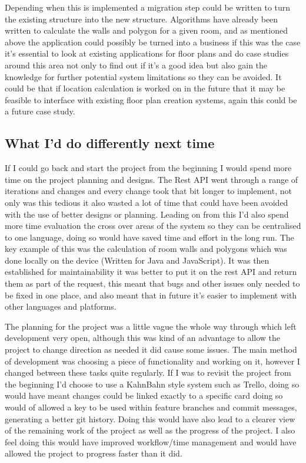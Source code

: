 Depending when this is implemented a migration step could be written to turn the existing structure into the new structure. Algorithms have already been written to calculate the walls and polygon for a given room, and as mentioned above the application could possibly be turned into a business if this was the case it's essential to look at existing applications for floor plans and do case studies around this area not only to find out if it's a good idea but also gain the knowledge for further potential system limitations so they can be avoided. It could be that if location calculation is worked on in the future that it may be feasible to interface with existing floor plan creation systems, again this could be a future case study.

\subsection{What I'd do differently next time}
If I could go back and start the project from the beginning I would spend more time on the project planning and designs. The Rest API went through a range of iterations and changes and every change took that bit longer to implement, not only was this tedious it also wasted a lot of time that could have been avoided with the use of better designs or planning. Leading on from this I'd also spend more time evaluation the cross over areas of the system so they can be centralised to one language, doing so would have saved time and effort in the long run. The key example of this was the calculation of room walls and polygons which was done locally on the device (Written for Java and JavaScript). It was then established for maintainability it was better to put it on the rest API and return them as part of the request, this meant that bugs and other issues only needed to be fixed in one place, and also meant that in future it's easier to implement with other languages and platforms.

The planning for the project was a little vague the whole way through which left development very open, although this was kind of an advantage to allow the project to change direction as needed it did cause some issues. The main method of development was choosing a piece of functionality and working on it, however I changed between these tasks quite regularly. If I was to revisit the project from the beginning I'd choose to use a KahnBahn style system such as Trello, doing so would have meant changes could be linked exactly to a specific card doing so would of allowed a key to be used within feature branches and commit messages, generating a better git history. Doing this would have also lead to a clearer view of the remaining work of the project as well as the progress of the project. I also feel doing this would have improved workflow/time management and would have allowed the project to progress faster than it did. 

